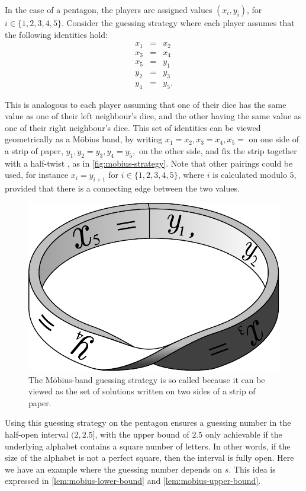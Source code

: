 In the case of a pentagon, the players are assigned values $(x_i, y_i)$, for $i \in \{1, 2, 3, 4, 5\}$. Consider the guessing strategy where each player assumes that the following identities hold:
\begin{eqnarray}
  	x_1 & = & x_2 \nonumber \\
  	x_3 & = & x_4 \nonumber \\
  	x_5 & = & y_1 \nonumber \\
  	y_2 & = & y_3 \nonumber \\
  	y_4 & = & y_5. \label{eqn:mobius}
\end{eqnarray}

\newpage

This is analogous to each player assuming that one of their dice has the same value as one of their left neighbour's dice, and the other having the same value as one of their right neighbour's dice. This set of identities can be viewed geometrically as a M{\"o}bius band, by writing $x_1 = x_2, x_3 = x_4, x_5 = $ on one side of a strip of paper, $y_1, y_2 = y_3, y_4 = y_5,$ on the other side, and fix the strip together with a half-twist \cite{riis2007}, as in \autoref{fig:mobius-strategy}. Note that other pairings could be used, for instance $x_i = y_{i + 1}$ for $i \in \{1, 2, 3, 4, 5\}$, where $i$ is calculated modulo $5$, provided that there is a connecting edge between the two values.

\begin{figure}[ht]
	\centering
	\includegraphics[width=.5\textwidth]{figures/mobius_strategy.pdf}
	\caption[The M{\"o}bius-band guessing strategy]{The M{\"o}bius-band guessing strategy is so called because it can be viewed as the set of solutions written on two sides of a strip of paper.}
	\label{fig:mobius-strategy}
\end{figure}

Using this guessing strategy on the pentagon ensures a guessing number in the half-open interval $(2, 2.5]$, with the upper bound of $2.5$ only achievable if the underlying alphabet contains a square number of letters. In other words, if the size of the alphabet is not a perfect square, then the interval is fully open. Here we have an example where the guessing number depends on $s$. This idea is expressed in \autoref{lem:mobius-lower-bound} and \autoref{lem:mobius-upper-bound}.

